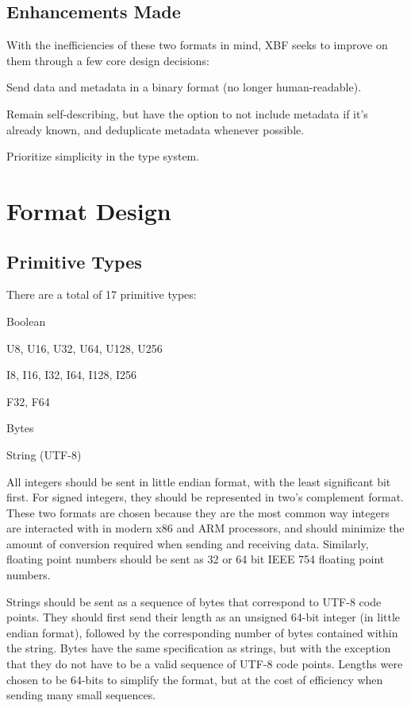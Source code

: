 \documentclass[conference]{IEEEtran}
\begin{document}
\subsection{Enhancements Made}

With the inefficiencies of these two formats in mind, XBF seeks to improve on them through a few core design decisions:

\begin{IEEEitemize}
	\item Send data and metadata in a binary format (no longer human-readable).
	\item Remain self-describing, but have the option to not include metadata if it's already known, and deduplicate metadata whenever possible.
	\item Prioritize simplicity in the type system.
\end{IEEEitemize}

\section{Format Design}

\subsection{Primitive Types}

There are a total of 17  primitive types:

\begin{IEEEitemize}
	\item Boolean
	\item U8, U16, U32, U64, U128, U256
	\item I8, I16, I32, I64, I128, I256
	\item F32, F64
	\item Bytes
	\item String (UTF-8)
\end{IEEEitemize}

All integers should be sent in little endian format, with the least significant bit first. For signed integers, they should be represented in two's complement format. These two formats are chosen because they are the most common way integers are interacted with in modern x86 and ARM processors, and should minimize the amount of conversion required when sending and receiving data. Similarly, floating point numbers should be sent as 32 or 64 bit IEEE 754 floating point numbers.

Strings should be sent as a sequence of bytes that correspond to UTF-8 code points. They should first send their length as an unsigned 64-bit integer (in little endian format), followed by the corresponding number of bytes contained within the string. Bytes have the same specification as strings, but with the exception that they do not have to be a valid sequence of UTF-8 code points. Lengths were chosen to be 64-bits to simplify the format, but at the cost of efficiency when sending many small sequences.
\end{document}
